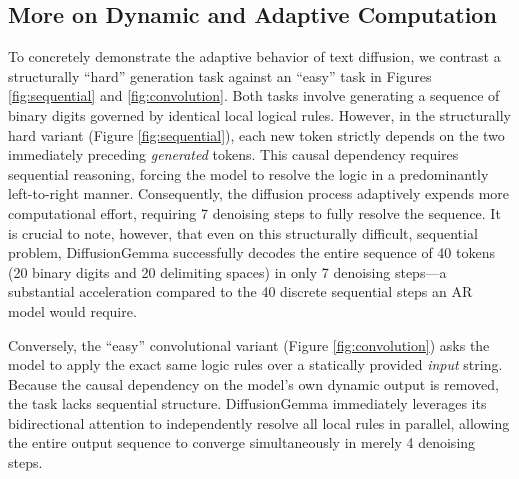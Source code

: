 \documentclass[11pt, a4paper, logo, copyright, gdm]{google}
\begin{document}
\newpage
\subsection{More on Dynamic and Adaptive Computation}\label{app:advantages_adaptive}
To concretely demonstrate the adaptive behavior of text diffusion, we contrast a structurally ``hard'' generation task against an ``easy'' task in Figures \ref{fig:sequential} and \ref{fig:convolution}. Both tasks involve generating a sequence of binary digits governed by identical local logical rules. However, in the structurally hard variant (Figure \ref{fig:sequential}), each new token strictly depends on the two immediately preceding \emph{generated} tokens. This causal dependency requires sequential reasoning, forcing the model to resolve the logic in a predominantly left-to-right manner. Consequently, the diffusion process adaptively expends more computational effort, requiring 7 denoising steps to fully resolve the sequence. It is crucial to note, however, that even on this structurally difficult, sequential problem, DiffusionGemma successfully decodes the entire sequence of 40 tokens (20 binary digits and 20 delimiting spaces) in only 7 denoising steps---a substantial acceleration compared to the 40 discrete sequential steps an AR model would require.

Conversely, the ``easy'' convolutional variant (Figure \ref{fig:convolution}) asks the model to apply the exact same logic rules over a statically provided \emph{input} string. Because the causal dependency on the model's own dynamic output is removed, the task lacks sequential structure. DiffusionGemma immediately leverages its bidirectional attention to independently resolve all local rules in parallel, allowing the entire output sequence to converge simultaneously in merely 4 denoising steps.
\end{document}
